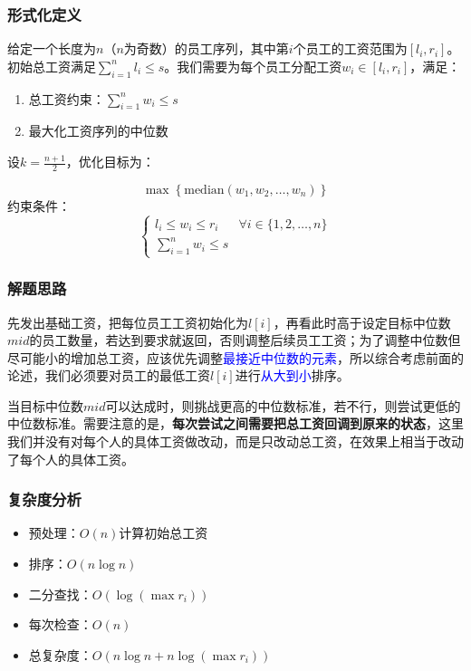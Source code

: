 \documentclass[../mainReport.tex]{subfiles}
\begin{document}
\subsubsection{形式化定义}
给定一个长度为$n$（$n$为奇数）的员工序列，其中第$i$个员工的工资范围为$[l_i, r_i]$。初始总工资满足$\sum_{i=1}^n l_i \leq s$。我们需要为每个员工分配工资$w_i \in [l_i, r_i]$，满足：

\begin{enumerate}
    \item 总工资约束：$\sum_{i=1}^n w_i \leq s$
    \item 最大化工资序列的中位数
\end{enumerate}

设$k = \frac{n+1}{2}$，优化目标为：

$$
\max \left\{ \text{median}(w_1, w_2, \dots, w_n) \right\}
$$
约束条件：
$$
\begin{cases}
    l_i \leq w_i \leq r_i & \forall i \in \{1,2,\dots,n\} \\
    \sum_{i=1}^n w_i \leq s
\end{cases}
$$

\subsubsection{解题思路}
先发出基础工资，把每位员工工资初始化为$l[i]$，再看此时高于设定目标中位数$mid$的员工数量，若达到要求就返回，否则调整后续员工工资；为了调整中位数但尽可能小的增加总工资，应该优先调整\textcolor{blue}{最接近中位数的元素}，所以综合考虑前面的论述，我们必须要对员工的最低工资$l[i]$进行\textcolor{blue}{从大到小}排序。

当目标中位数$mid$可以达成时，则挑战更高的中位数标准，若不行，则尝试更低的中位数标准。需要注意的是，\textbf{每次尝试之间需要把总工资回调到原来的状态}，这里我们并没有对每个人的具体工资做改动，而是只改动总工资，在效果上相当于改动了每个人的具体工资。

\subsubsection{复杂度分析}
\begin{itemize}
    \item 预处理：$O(n)$计算初始总工资
    \item 排序：$O(n \log n)$
    \item 二分查找：$O(\log (\max r_i))$
    \item 每次检查：$O(n)$
    \item 总复杂度：$O(n \log n + n \log (\max r_i))$
\end{itemize}
\end{document}
